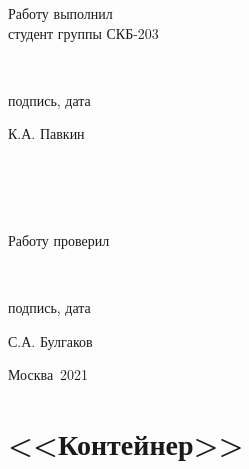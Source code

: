 \documentclass[a4paper,12pt]{article}
\begin{document}
\begin{titlepage}
\begin{flushright}
	\begin{minipage}[center]{15cm}
		\begin{minipage}[left]{5cm}
			{Работу выполнил\\студент группы СКБ-203}
		\end{minipage}
		\begin{minipage}[center]{5cm}
			\vspace{1.25cm}
			\hrulefill\\[-1cm]
			\begin{center}{подпись, дата}\end{center}
		\end{minipage}
		\begin{minipage}[right]{4cm}
			\vspace{0.4cm}
			\begin{flushright}{К.А. Павкин}\end{flushright}
		\end{minipage}
		\\
		\\
		\\
		\begin{minipage}[left]{5cm}
			{Работу проверил}
		\end{minipage}
		\begin{minipage}[center]{5cm}
			\vspace{1.25cm}
			\hrulefill\\[-1cm]
			\begin{center}{подпись, дата}\end{center}
		\end{minipage}
		\begin{minipage}[right]{4cm}
			\begin{flushright}{С.А. Булгаков}\end{flushright}
		\end{minipage}
	\end{minipage}
\end{flushright}

\vspace{\fill}

\begin{center}
	Москва~2021
\end{center}

\end{titlepage}

\tableofcontents
\thispagestyle{empty}
\cleardoublepage

\section*{<<Контейнер>>}
\end{document}
